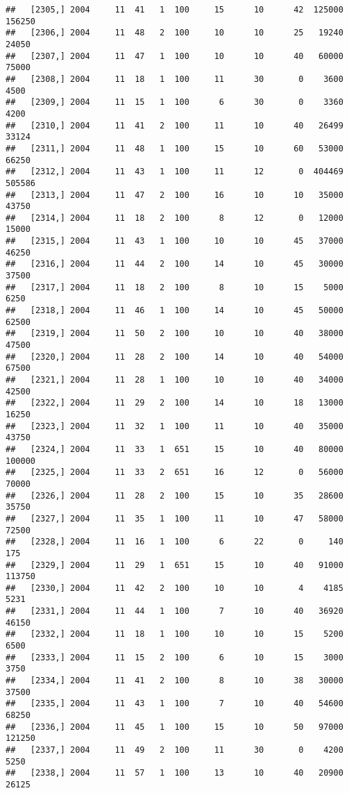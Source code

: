 \documentclass{article}\usepackage[]{graphicx}\usepackage[]{color}
\makeatletter
\newenvironment{kframe}{%
 \def\at@end@of@kframe{}%
 \ifinner\ifhmode%
  \def\at@end@of@kframe{\end{minipage}}%
  \begin{minipage}{\columnwidth}%
 \fi\fi%
 \def\FrameCommand##1{\hskip\@totalleftmargin \hskip-\fboxsep
 \colorbox{shadecolor}{##1}\hskip-\fboxsep
     \hskip-\linewidth \hskip-\@totalleftmargin \hskip\columnwidth}%
 \MakeFramed {\advance\hsize-\width
   \@totalleftmargin\z@ \linewidth\hsize
   \@setminipage}}%
 {\par\unskip\endMakeFramed%
 \at@end@of@kframe}
\newenvironment{knitrout}{}{} %
\makeatother
\begin{document}
\begin{knitrout}
\begin{kframe}
\begin{verbatim}
##   [2305,] 2004     11  41   1  100     15      10      42  125000  156250
##   [2306,] 2004     11  48   2  100     10      10      25   19240   24050
##   [2307,] 2004     11  47   1  100     10      10      40   60000   75000
##   [2308,] 2004     11  18   1  100     11      30       0    3600    4500
##   [2309,] 2004     11  15   1  100      6      30       0    3360    4200
##   [2310,] 2004     11  41   2  100     11      10      40   26499   33124
##   [2311,] 2004     11  48   1  100     15      10      60   53000   66250
##   [2312,] 2004     11  43   1  100     11      12       0  404469  505586
##   [2313,] 2004     11  47   2  100     16      10      10   35000   43750
##   [2314,] 2004     11  18   2  100      8      12       0   12000   15000
##   [2315,] 2004     11  43   1  100     10      10      45   37000   46250
##   [2316,] 2004     11  44   2  100     14      10      45   30000   37500
##   [2317,] 2004     11  18   2  100      8      10      15    5000    6250
##   [2318,] 2004     11  46   1  100     14      10      45   50000   62500
##   [2319,] 2004     11  50   2  100     10      10      40   38000   47500
##   [2320,] 2004     11  28   2  100     14      10      40   54000   67500
##   [2321,] 2004     11  28   1  100     10      10      40   34000   42500
##   [2322,] 2004     11  29   2  100     14      10      18   13000   16250
##   [2323,] 2004     11  32   1  100     11      10      40   35000   43750
##   [2324,] 2004     11  33   1  651     15      10      40   80000  100000
##   [2325,] 2004     11  33   2  651     16      12       0   56000   70000
##   [2326,] 2004     11  28   2  100     15      10      35   28600   35750
##   [2327,] 2004     11  35   1  100     11      10      47   58000   72500
##   [2328,] 2004     11  16   1  100      6      22       0     140     175
##   [2329,] 2004     11  29   1  651     15      10      40   91000  113750
##   [2330,] 2004     11  42   2  100     10      10       4    4185    5231
##   [2331,] 2004     11  44   1  100      7      10      40   36920   46150
##   [2332,] 2004     11  18   1  100     10      10      15    5200    6500
##   [2333,] 2004     11  15   2  100      6      10      15    3000    3750
##   [2334,] 2004     11  41   2  100      8      10      38   30000   37500
##   [2335,] 2004     11  43   1  100      7      10      40   54600   68250
##   [2336,] 2004     11  45   1  100     15      10      50   97000  121250
##   [2337,] 2004     11  49   2  100     11      30       0    4200    5250
##   [2338,] 2004     11  57   1  100     13      10      40   20900   26125

\end{verbatim}
\end{kframe}
\end{knitrout}
\end{document}
